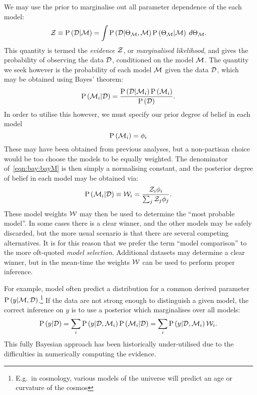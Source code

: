 We may use the prior to marginalise out all parameter dependence of the each model:
\begin{equation}
  \mathcal{Z}\equiv\mathrm{P}\left(\mathcal{D}\middle|\mathcal{M}\right) 
  =
  \int  \mathrm{P}\left(\mathcal{D}\middle|\Theta_{\mathcal{M}},\mathcal{M}\right)\mathrm{P}\left(\Theta_{\mathcal{M}}\middle|\mathcal{M}\right)\:d\Theta_{\mathcal{M}}.
  \label{eqn:bay:ev_def}
\end{equation}
This quantity is termed the {\em evidence\/} $\mathcal{Z}$, or {\em marginalised likelihood}, and gives the probability of observing the data $\mathcal{D}$, conditioned on the model $\mathcal{M}$. The quantity we seek however is the probability of each model $\mathcal{M}$ given the data $\mathcal{D}$, which may be obtained using Bayes' theorem:
\begin{equation}
  \mathrm{P}\left(\mathcal{M}_i\middle|\mathcal{D}\right) = \frac{\mathrm{P}\left(\mathcal{D}\middle|\mathcal{M}_i\right)\mathrm{P}\left(\mathcal{M}_i\right)}{\mathrm{P}\left(\mathcal{D}\right)}.
  \label{eqn:bay:bayM}
\end{equation}
In order to utilise this however, we must specify our prior degree of belief in each model
\begin{equation}
  \mathrm{P}\left(\mathcal{M}_i\right) = \phi_i
\end{equation}
These may have been obtained from previous analyses, but a non-partisan choice would be too choose the models to be equally weighted. The denominator of~\eqref{eqn:bay:bayM} is then simply a normalising constant, and the posterior degree of belief in each model may be obtained via:
\begin{equation}
  \mathrm{P}\left(\mathcal{M}_i\middle|\mathcal{D}\right) 
  \equiv
  \mathcal{W}_i
  =
  \frac{\mathcal{Z}_i\phi_i}{\sum_j \mathcal{Z}_j\phi_j}.
\end{equation}
These model weights $\mathcal{W}$ may then be used to determine the ``most probable model''. In some cases there is a clear winner, and the other models may be safely discarded, but the more usual scenario is that there are several competing alternatives. It is for this reason that we prefer the term ``model comparison'' to the more oft-quoted {\em model selection}. Additional datasets may determine a clear winner, but in the mean-time the weights $\mathcal{W}$ can be used to perform proper inference. 

For example, model often predict a distribution for a common derived parameter $\mathrm{P}\left(y\middle|\mathcal{M},\mathcal{D}\right)$.\footnote{E.g.\ in cosmology, various models of the universe will predict an age or curvature of the cosmos} If the data are not strong enough to distinguish a given model, the correct inference on $y$ is to use a posterior which marginalises over all models:
\begin{equation}
  \mathrm{P}\left(y\middle|\mathcal{D}\right) 
  = \sum_i\mathrm{P}\left(y\middle|\mathcal{D},\mathcal{M}_i\right)\mathrm{P}\left(\mathcal{M}_i\middle|\mathcal{D}\right)
  = \sum_i\mathrm{P}\left(y\middle|\mathcal{D},\mathcal{M}_i\right)\mathcal{W}_i.
\end{equation}
This fully Bayesian approach has been historically under-utilised due to the difficulties in numerically computing the evidence.




